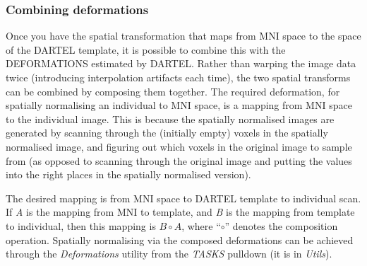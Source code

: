 \subsubsection{Combining deformations}
Once you have the spatial transformation that maps from MNI space to the space of the DARTEL template, it is possible to combine this with the DEFORMATIONS estimated by DARTEL.
Rather than warping the image data twice (introducing interpolation artifacts each time), the two spatial transforms can be combined by composing them together.
The required deformation, for spatially normalising an individual to MNI space, is a mapping from MNI space to the individual image.
This is because the spatially normalised images are generated by scanning through the (initially empty) voxels in the spatially normalised image, and figuring out which voxels in the original image to sample from (as opposed to scanning through the original image and putting the values into the right places in the spatially normalised version).

The desired mapping is from MNI space to DARTEL template to individual scan.
If \emph{A} is the mapping from MNI to template, and \emph{B} is the mapping from template to individual, then this mapping is $B \circ A$, where ``$\circ$'' denotes the composition operation.
Spatially normalising via the composed deformations can be achieved through the \emph{Deformations} utility from the \emph{TASKS} pulldown (it is in \emph{Utils}). 

